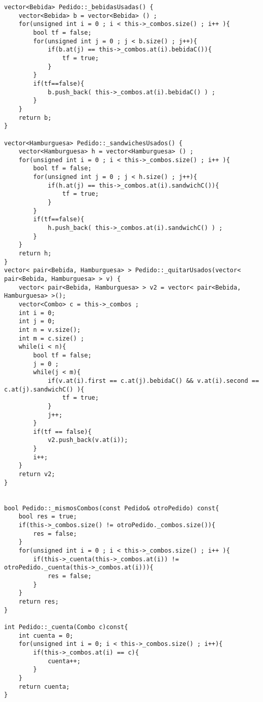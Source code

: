 \begin{lstlisting}
vector<Bebida> Pedido::_bebidasUsadas() {
	vector<Bebida> b = vector<Bebida> () ;
	for(unsigned int i = 0 ; i < this->_combos.size() ; i++ ){
		bool tf = false;
		for(unsigned int j = 0 ; j < b.size() ; j++){
			if(b.at(j) == this->_combos.at(i).bebidaC()){
				tf = true;
			}
		}
		if(tf==false){
			b.push_back( this->_combos.at(i).bebidaC() ) ;
		}
	}
	return b;
}

vector<Hamburguesa> Pedido::_sandwichesUsados() {
	vector<Hamburguesa> h = vector<Hamburguesa> () ;
	for(unsigned int i = 0 ; i < this->_combos.size() ; i++ ){
		bool tf = false;
		for(unsigned int j = 0 ; j < h.size() ; j++){
			if(h.at(j) == this->_combos.at(i).sandwichC()){
				tf = true;
			}
		}
		if(tf==false){
			h.push_back( this->_combos.at(i).sandwichC() ) ;
		}
	}
	return h;
}
vector< pair<Bebida, Hamburguesa> > Pedido::_quitarUsados(vector< pair<Bebida, Hamburguesa> > v) {
	vector< pair<Bebida, Hamburguesa> > v2 = vector< pair<Bebida, Hamburguesa> >();
	vector<Combo> c = this->_combos ;
	int i = 0;
	int j = 0;
	int n = v.size();
	int m = c.size() ;
	while(i < n){
		bool tf = false;
		j = 0 ;
		while(j < m){
			if(v.at(i).first == c.at(j).bebidaC() && v.at(i).second == c.at(j).sandwichC() ){
				tf = true;
			}
			j++;
		}
		if(tf == false){
			v2.push_back(v.at(i));
		}
		i++;
	}
	return v2;
}


bool Pedido::_mismosCombos(const Pedido& otroPedido) const{
	bool res = true;
	if(this->_combos.size() != otroPedido._combos.size()){
		res = false;
	}
	for(unsigned int i = 0 ; i < this->_combos.size() ; i++ ){
		if(this->_cuenta(this->_combos.at(i)) != otroPedido._cuenta(this->_combos.at(i))){
			res = false;
		}
	}
	return res;
}

int Pedido::_cuenta(Combo c)const{
	int cuenta = 0;
	for(unsigned int i = 0; i < this->_combos.size() ; i++){
		if(this->_combos.at(i) == c){
			cuenta++;
		}
	}
	return cuenta;
}

\end{lstlisting}